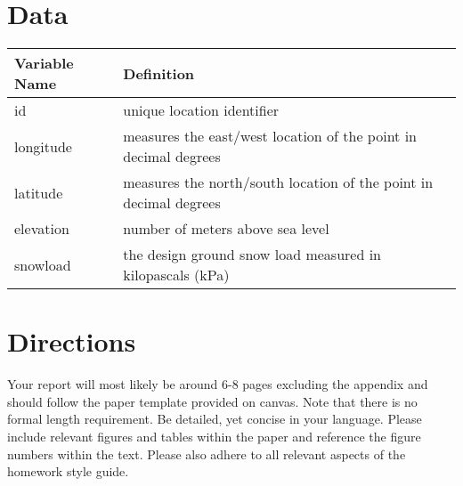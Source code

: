 \documentclass[12pt]{notes}
\begin{document}
\section*{Data}
\begin{center}
\renewcommand{\arraystretch}{1.25}
\begin{tabular}{|l | l|}
\hline
\textbf{Variable Name} & \textbf{Definition}\\ \hline
id & unique location identifier \\ \hline
longitude & measures the east/west location of the point in decimal degrees \\ \hline
latitude & measures the north/south location of the point in decimal degrees \\ \hline
elevation & number of meters above sea level \\ \hline
snowload & the design ground snow load measured in kilopascals (kPa) \\ \hline
\end{tabular}
\end{center}

\section*{Directions}
Your report will most likely be around 6-8 pages excluding the appendix and should follow the paper template provided on canvas. Note that there is no formal length requirement. Be detailed, yet concise in your language. Please include relevant figures and tables within the paper and reference the figure numbers within the text. Please also adhere to all relevant aspects of the homework style guide.


\end{document}
